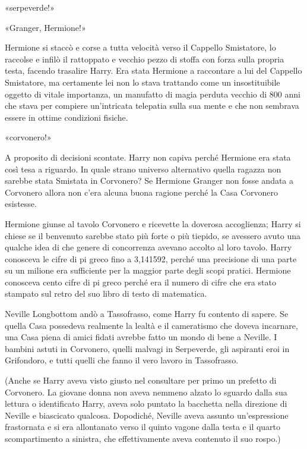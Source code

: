 «serpeverde!»

«Granger, Hermione!»

Hermione si staccò e corse a tutta velocità verso il Cappello Smistatore, lo raccolse e infilò il rattoppato e vecchio pezzo di stoffa con forza sulla propria testa, facendo trasalire Harry. Era stata Hermione a raccontare a lui del Cappello Smistatore, ma certamente lei non lo stava trattando come un insostituibile oggetto di vitale importanza, un manufatto di magia perduta vecchio di 800 anni che stava per compiere un’intricata telepatia sulla sua mente e che non sembrava essere in ottime condizioni fisiche.

«corvonero!»

A proposito di decisioni scontate. Harry non capiva perché Hermione era stata così tesa a riguardo. In quale strano universo alternativo quella ragazza non sarebbe stata Smistata in Corvonero? Se Hermione Granger non fosse andata a Corvonero allora non c’era alcuna buona ragione perché la Casa Corvonero esistesse.

Hermione giunse al tavolo Corvonero e ricevette la doverosa accoglienza; Harry si chiese se il benvenuto sarebbe stato più forte o più tiepido, se avessero avuto una qualche idea di che genere di concorrenza avevano accolto al loro tavolo. Harry conosceva le cifre di pi greco fino a 3,141592, perché una precisione di una parte su un milione era sufficiente per la maggior parte degli scopi pratici. Hermione conosceva cento cifre di pi greco perché era il numero di cifre che era stato stampato sul retro del suo libro di testo di matematica.

Neville Longbottom andò a Tassofrasso, come Harry fu contento di sapere. Se quella Casa possedeva realmente la lealtà e il cameratismo che doveva incarnare, una Casa piena di amici fidati avrebbe fatto un mondo di bene a Neville. I bambini astuti in Corvonero, quelli malvagi in Serpeverde, gli aspiranti eroi in Grifondoro, e tutti quelli che fanno il vero lavoro in Tassofrasso.

(Anche se Harry aveva visto giusto nel consultare per primo un prefetto di Corvonero. La giovane donna non aveva nemmeno alzato lo sguardo dalla sua lettura o identificato Harry, aveva solo puntato la bacchetta nella direzione di Neville e biascicato qualcosa. Dopodiché, Neville aveva assunto un’espressione frastornata e si era allontanato verso il quinto vagone dalla testa e il quarto scompartimento a sinistra, che effettivamente aveva contenuto il suo rospo.)

